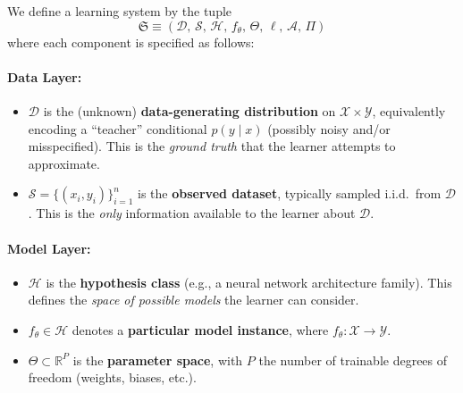 \documentclass[
  journal=largetwo,
  year=2025,
  volume=37,
]{cup-journal}
\begin{document}
\begin{setting}\label{set:ml_system_components}
We define a learning system by the tuple
\begin{equation}
    \boxed{\mathfrak{S} \equiv (\mathcal{D},\, \mathcal{S},\, \mathcal{H},\, f_\theta,\, \Theta,\, \ell,\, \mathcal{A},\, \Pi)}
\end{equation}
where each component is specified as follows:

\paragraph{Data Layer:}
\begin{itemize}
    \item $\mathcal{D}$ is the (unknown) \textbf{data-generating distribution} on $\mathcal{X}\times\mathcal{Y}$, equivalently encoding a ``teacher'' conditional $p(y\mid x)$ (possibly noisy and/or misspecified). This is the \textit{ground truth} that the learner attempts to approximate.
    \item $\mathcal{S}=\{(x_i,y_i)\}_{i=1}^n$ is the \textbf{observed dataset}, typically sampled i.i.d.\ from $\mathcal{D}$. This is the \textit{only} information available to the learner about $\mathcal{D}$.
\end{itemize}

\paragraph{Model Layer:}
\begin{itemize}
    \item $\mathcal{H}$ is the \textbf{hypothesis class} (e.g., a neural network architecture family). This defines the \textit{space of possible models} the learner can consider.
    \item $f_\theta\in\mathcal{H}$ denotes a \textbf{particular model instance}, where $f_\theta: \mathcal{X}\to\mathcal{Y}$.
    \item $\Theta\subset\mathbb{R}^P$ is the \textbf{parameter space}, with $P$ the number of trainable degrees of freedom (weights, biases, etc.).
\end{itemize}


\end{setting}
\end{document}
